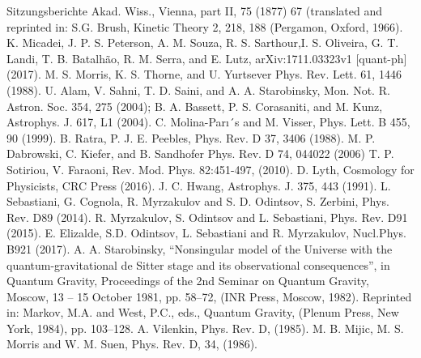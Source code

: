 \documentclass[a4paper,11pt]{article}
\begin{document}
\begin{thebibliography}{99}
Sitzungsberichte Akad. Wiss., Vienna, part II, 75 (1877)
67 (translated and reprinted in: S.G. Brush, Kinetic Theory
2, 218, 188 (Pergamon, Oxford, 1966).
K. Micadei, J. P. S. Peterson, A. M. Souza, R. S. Sarthour,I. S.
Oliveira, G. T. Landi, T. B. Batalhão, R. M. Serra, and E. Lutz, arXiv:1711.03323v1 [quant-ph] (2017).
M. S. Morris, K. S. Thorne, and U. Yurtsever
Phys. Rev. Lett. 61, 1446 (1988).
 U. Alam, V. Sahni, T. D. Saini, and A. A. Starobinsky, Mon. Not. R.
Astron. Soc. 354, 275 (2004); B. A. Bassett, P. S.
Corasaniti, and M. Kunz, Astrophys. J. 617, L1 (2004).%
C. Molina-Parı´s and M. Visser, Phys. Lett. B 455, 90 (1999). %
B. Ratra, P. J. E. Peebles, Phys. Rev. D 37, 3406 (1988).
M. P. Dabrowski, C. Kiefer, and B. Sandhofer
Phys. Rev. D 74, 044022 (2006)
T. P. Sotiriou, V. Faraoni, Rev. Mod. Phys. 82:451-497, (2010).
D. Lyth, Cosmology for Physicists, CRC Press (2016).  
J. C. Hwang, Astrophys. J. 375, 443 (1991).
L. Sebastiani, G. Cognola, R. Myrzakulov and S. D. Odintsov, S. Zerbini, Phys. Rev. D89 (2014).
R. Myrzakulov, S. Odintsov and L. Sebastiani, Phys. Rev. D91 (2015).
E. Elizalde, S.D. Odintsov, L. Sebastiani and R. Myrzakulov, Nucl.Phys. B921 (2017).
A. A. Starobinsky, “Nonsingular model of the Universe with the quantum-gravitational
de Sitter stage and its observational consequences”, in Quantum Gravity, Proceedings of
the 2nd Seminar on Quantum Gravity, Moscow, 13 – 15 October 1981, pp. 58–72, (INR
Press, Moscow, 1982). Reprinted in: Markov, M.A. and West, P.C., eds., Quantum Gravity,
(Plenum Press, New York, 1984), pp. 103–128.
A. Vilenkin, Phys. Rev. D, (1985).
M. B. Mijic, M. S. Morris and W. M. Suen, Phys. Rev. D, 34, (1986). 

\end{thebibliography}
\end{document}
